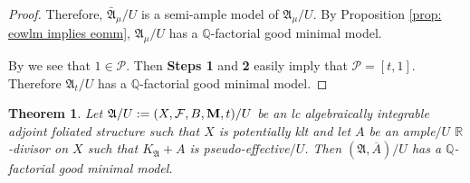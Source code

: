 \documentclass[12pt]{amsart}
\numberwithin{equation}{section}
\newcommand{\Mm}{{\bf{M}}}
\newcommand{\Rr}{\mathbb{R}}
\newcommand{\Aa}{{\mathfrak{A}}}
\newcommand{\Ff}{\mathcal{F}}
\newtheorem{thm}{Theorem}[section]
\theoremstyle{definition}
\theoremstyle{definition}
\theoremstyle{definition}
\begin{document}
\begin{proof}
Therefore, $\bar\Aa_{\mu}/U$ is a semi-ample model of $\Aa_{\mu}/U$. By Proposition \ref{prop: eowlm implies eomm}, $\Aa_{\mu}/U$ has a $\mathbb Q$-factorial good minimal model.

\medskip

By \cite[Theorem 1.5]{LMX24} we see that $1 \in \mathcal P$. Then \textbf{Steps 1} and \textbf{2} easily imply that $\mathcal P = [t, 1]$. Therefore $\Aa_t/U$ has a $\mathbb Q$-factorial good minimal model.
\end{proof}

\begin{thm}\label{thm: eogmm lc plus ample case}
    Let $\Aa/U:=(X,\Ff,B,\Mm,t)/U$ be an lc algebraically integrable adjoint foliated structure such that $X$ is potentially klt and let $A$ be an ample$/U$ $\Rr$-divisor on $X$ such that $K_{\Aa}+A$ is pseudo-effective$/U$. Then $(\Aa,\overline{A})/U$ has a $\mathbb Q$-factorial good minimal model.
\end{thm}
\end{document}

